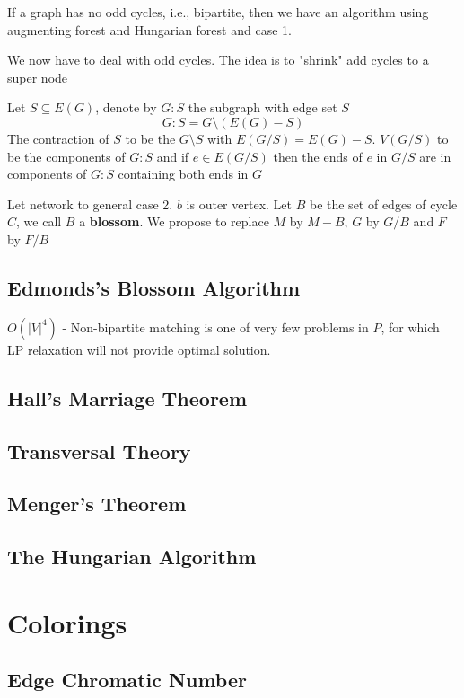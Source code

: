 			If a graph has no odd cycles, i.e., bipartite, then we have an algorithm using augmenting forest and Hungarian forest and case 1.

			We now have to deal with odd cycles. The idea is to "shrink" add cycles to a super node

			Let $S\subseteq E(G)$, denote by $G: S$ the subgraph with edge set $S$
			\begin{equation}
				G:S = G\setminus (E(G)-S)
			\end{equation}
			The contraction of $S$ to be the $G\setminus S$ with $E(G / S) = E(G) - S$. $V(G/S)$ to be the components of $G:S$ and if $e\in E(G/S)$ then the ends of $e$ in $G/S$ are in components of $G:S$ containing both ends in $G$

			Let network to general case 2. $b$ is outer vertex. Let $B$ be the set of edges of cycle $C$, we call $B$ a \textbf{blossom}. We propose to replace $M$ by $M - B$, $G$ by $G/B$ and $F$ by $F/B$

		\section{Edmonds's Blossom Algorithm}


			$O(|V|^4)$
			- Non-bipartite matching is one of very few problems in $P$, for which LP relaxation will not provide optimal solution.

		\section{Hall's Marriage Theorem}

		\section{Transversal Theory}

		\section{Menger's Theorem}

		\section{The Hungarian Algorithm}

	\chapter{Colorings}
		\section{Edge Chromatic Number}

